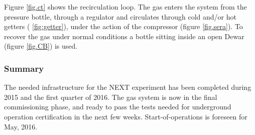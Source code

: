 Figure \ref{fig.ct} shows the recirculation loop. The gas enters the system from the pressure bottle, through a regulator and circulates through cold and/or hot getters ( \ref{fig:getter}), under the action of the compressor 
(figure \ref{fig.sera}). To recover the gas under normal conditions a bottle sitting inside an open Dewar (figure \ref{fig.CB}) is used. 

\subsubsection*{Summary}
 
The needed infrastructure for the NEXT experiment has been completed during 2015 and the first quarter of 2016. The gas system is now in the final commissioning phase, and ready to pass the tests needed for underground operation certification in the next few weeks. Start-of-operations is foreseen for May, 2016. 
